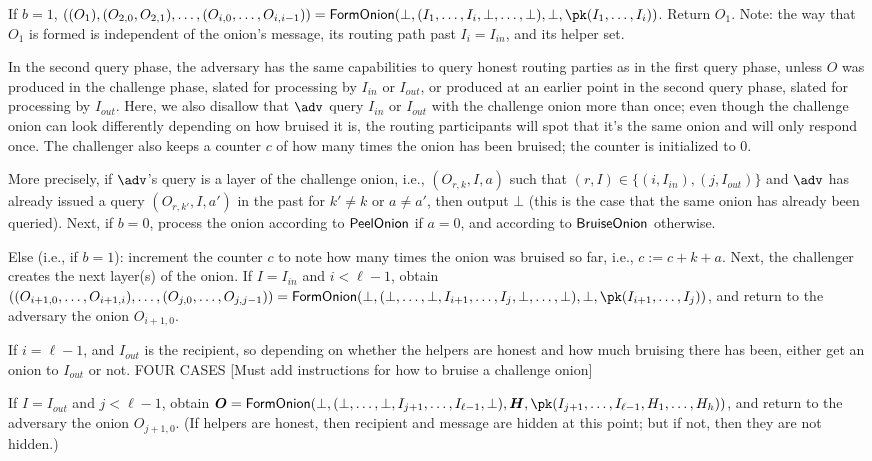 If $b=1$, $((O_1), (O_{2, 0}, O_{2, 1}), \dots, (O_{i, 0}, \dots, O_{i, i-1}))= \formonion(\bot,(I_1,\ldots,I_i,\bot,\ldots,\bot),\bot,\pk(I_1,\ldots,I_i))$.  Return $O_1$.  Note: the way that $O_1$ is formed is independent of the onion's message, its routing path past $I_i = I_{\mathit{in}}$, and its helper set.  

In the second query phase, the adversary has the same capabilities to query honest routing parties as in the first query phase, unless $O$ was produced in the challenge phase, slated for processing by $I_{\mathit{in}}$ or $I_{\mathit{out}}$, or produced at an earlier point in the second query phase, slated for processing by $I_{\mathit{out}}$.  Here, we also disallow that $\adv$ query $I_{\mathit{in}}$ or $I_{\mathit{out}}$ with the challenge onion more than once; even though the challenge onion can look differently depending on how bruised it is, the routing participants will spot that it's the same onion and will only respond once.  The challenger also keeps a counter $c$ of how many times the onion has been bruised; the counter is initialized to $0$.

More precisely, if $\adv$'s query is a layer of the challenge onion, i.e., $(O_{r,k},I,a)$ such that $(r,I) \in \{(i,I_\mathit{in}),(j,I_\mathit{out})\}$ and $\adv$ has already issued a query $(O_{r,k'},I,a')$ in the past for $k'\neq k$ or $a\neq a'$, then output $\bot$ (this is the case that the same onion has already been queried).  Next, if $b=0$, process the onion according to $\mathsf{PeelOnion}$ if $a=0$, and according to $\mathsf{BruiseOnion}$ otherwise.

Else (i.e., if $b=1$): increment the counter $c$ to note how many times the onion was bruised so far, i.e., $c := c+k+a$.  Next, the challenger creates the next layer(s) of the onion.  If $I = I_\mathit{in}$ and $i < \ell-1$, obtain $((O_{i+1, 0}, \dots, O_{i+1, i}), \dots, (O_{j, 0}, \dots, O_{j,j-1})) = \formonion(\bot,(\bot,\ldots,\bot,I_{i+1},\ldots,I_{j},\bot,\ldots,\bot),\bot,\pk(I_{i+1},\ldots,I_j))$, and return to the adversary the onion $O_{i+1,0}$.  

If $i = \ell-1$, and $I_{\mathit{out}}$ is the recipient, so depending on whether the helpers are honest and how much bruising there has been, either get an onion to $I_{\mathit{out}}$ or not.  FOUR CASES  [Must add instructions for how to bruise a challenge onion]

If $I=I_{\mathit{out}}$ and $j < \ell-1$, obtain $\vec{O} = \formonion(\bot,(\bot,\ldots,\bot,I_{j+1},\ldots,I_{\ell-1},\bot),\vec{H},\pk(I_{j+1},\ldots,I_{\ell-1}, H_1,\ldots,H_h))$, and return to the adversary the onion $O_{j+1,0}$.  (If helpers are honest, then recipient and message are hidden at this point; but if not, then they are not hidden.)

